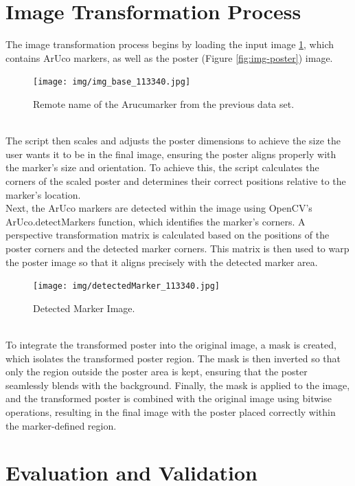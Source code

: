 \documentclass[a4paper,twocolumn]{article}
\begin{document}
\section{Image Transformation Process}
The image transformation process begins by loading the input image \ref{fig:example-base}, which contains ArUco markers, as well as the poster (Figure \ref{fig:img-poster}) image. 
\begin{figure}[htbp]
    \centering
    \texttt{[image: img/img\_base\_113340.jpg]} %
    \caption{Remote name of the Arucumarker from the previous data set.}
    \label{fig:example-base}
\end{figure}
\\
The script then scales and adjusts the poster dimensions to achieve the size the user wants it to be in the final image, ensuring the poster aligns properly with the marker's size and orientation. To achieve this, the script calculates the corners of the scaled poster and determines their correct positions relative to the marker's location. \cite{opencv}
\\
Next, the ArUco markers are detected within the image using OpenCV's ArUco.detectMarkers function, which identifies the marker's corners. A perspective transformation matrix is calculated based on the positions of the poster corners and the detected marker corners. This matrix is then used to warp the poster image so that it aligns precisely with the detected marker area.
\begin{figure}[htbp]
    \centering
    \texttt{[image: img/detectedMarker\_113340.jpg]} %
    \caption{Detected Marker Image.}
    \label{fig:detected-marker}
\end{figure}
\\
To integrate the transformed poster into the original image, a mask is created, which isolates the transformed poster region. 
The mask is then inverted so that only the region outside the poster area is kept, ensuring that the poster seamlessly blends with the background.
Finally, the mask is applied to the image, and the transformed poster is combined with the original image using bitwise operations, resulting in the final image with the poster placed correctly within the marker-defined region.

\section{Evaluation and Validation}
\end{document}
